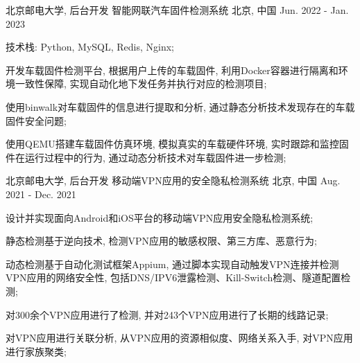 \begin{cventries}
    \cventry
      {北京邮电大学, 后台开发} %
      {智能网联汽车固件检测系统} %
      {北京, 中国} %
      {Jun. 2022 - Jan. 2023} %
      {
    \begin{cvitems} %
          \item {技术栈: Python, MySQL, Redis, Nginx;}
          \item {开发车载固件检测平台, 根据用户上传的车载固件, 利用Docker容器进行隔离和环境一致性保障, 实现自动化地下发任务并执行对应的检测项目;}
          \item {使用binwalk对车载固件的信息进行提取和分析, 通过静态分析技术发现存在的车载固件安全问题;}
          \item {使用QEMU搭建车载固件仿真环境, 模拟真实的车载硬件环境, 实时跟踪和监控固件在运行过程中的行为, 通过动态分析技术对车载固件进一步检测;}
        \end{cvitems}
      }
  \cventry
    {北京邮电大学, 后台开发} %
    {移动端VPN应用的安全隐私检测系统} %
    {北京, 中国} %
    {Aug. 2021 - Dec. 2021} %
    {
	\begin{cvitems} %
        \item {设计并实现面向Android和iOS平台的移动端VPN应用安全隐私检测系统;}
        \item {静态检测基于逆向技术, 检测VPN应用的敏感权限、第三方库、恶意行为;}
        \item {动态检测基于自动化测试框架Appium, 通过脚本实现自动触发VPN连接并检测VPN应用的网络安全性, 包括DNS/IPV6泄露检测、Kill-Switch检测、隧道配置检测;}
        \item {对300余个VPN应用进行了检测, 并对243个VPN应用进行了长期的线路记录;}
        \item {对VPN应用进行关联分析, 从VPN应用的资源相似度、网络关系入手, 对VPN应用进行家族聚类;}
      \end{cvitems}
    }

\end{cventries}
